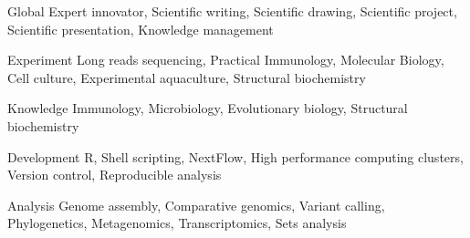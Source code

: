 

\begin{cvskills}

  \cvskill
    {Global} %
    {Expert innovator, Scientific writing, Scientific drawing, Scientific project, Scientific presentation, Knowledge management} %
    
  \cvskill
    {Experiment} %
    {Long reads sequencing, Practical Immunology, Molecular Biology, Cell culture, Experimental aquaculture, Structural biochemistry} %
    
  \cvskill
    {Knowledge} %
    {Immunology, Microbiology, Evolutionary biology, Structural biochemistry} %
    
  \cvskill
    {Development} %
    {R, Shell scripting, NextFlow, High performance computing clusters, Version control, Reproducible analysis} %
    
  \cvskill
    {Analysis} %
    {Genome assembly, Comparative genomics, Variant calling, Phylogenetics, Metagenomics, Transcriptomics, Sets analysis} %

\end{cvskills}